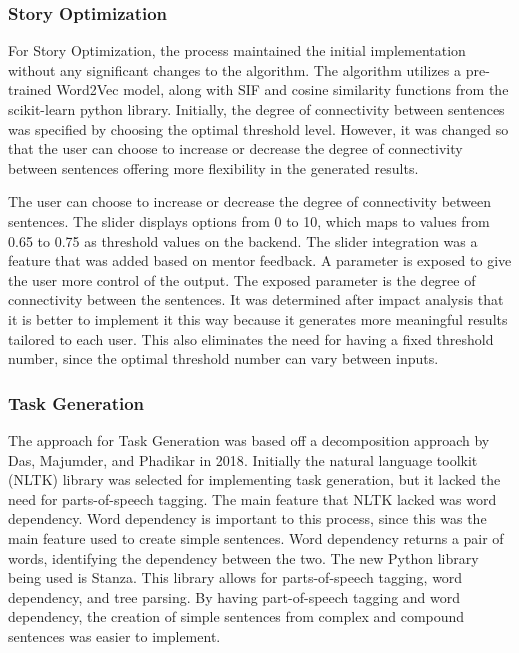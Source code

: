 \subsubsection{Story Optimization}
For Story Optimization, the process maintained the initial implementation without any significant changes to the algorithm. The algorithm utilizes a pre-trained Word2Vec model, along with SIF and cosine similarity functions from the scikit-learn python library. Initially, the degree of connectivity between sentences was specified by choosing the optimal threshold level. However, it was changed so that the user can choose to increase or decrease the degree of connectivity between sentences offering more flexibility in the generated results.

The user can choose to increase or decrease the degree of connectivity between sentences. The slider displays options from 0 to 10, which maps to values from 0.65 to 0.75 as threshold values on the backend. The slider integration was a feature that was added based on mentor feedback. A parameter is exposed to give the user more control of the output. The exposed parameter is the degree of connectivity between the sentences. It was determined after impact analysis that it is better to implement it this way because it generates more meaningful results tailored to each user. This also eliminates the need for having a fixed threshold number, since the optimal threshold number can vary between inputs.

\subsubsection{Task Generation}
The approach for Task Generation was based off a decomposition approach by Das, Majumder, and Phadikar in 2018\cite{NLP1}. Initially the natural language toolkit (NLTK) library was selected for implementing task generation, but it lacked the need for parts-of-speech tagging. The main feature that NLTK lacked was word dependency. Word dependency is important to this process, since this was the main feature used to create simple sentences. Word dependency returns a pair of words, identifying the dependency between the two. The new Python library being used is Stanza. This library allows for parts-of-speech tagging, word dependency, and tree parsing. By having part-of-speech tagging and word dependency, the creation of simple sentences from complex and compound sentences was easier to implement.


